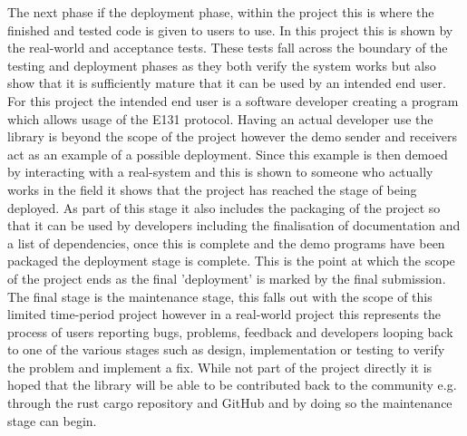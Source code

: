 \documentclass[11pt,a4paper]{report}
\begin{document}
The next phase if the deployment phase, within the project this is where the finished and tested code is given to users to use. In this project this is shown by the real-world and acceptance tests. These tests fall across the boundary of the testing and deployment phases as they both verify the system works but also show that it is sufficiently mature that it can be used by an intended end user. For this project the intended end user is a software developer creating a program which allows usage of the E131 protocol. Having an actual developer use the library is beyond the scope of the project however the demo sender and receivers act as an example of a possible deployment. Since this example is then demoed by interacting with a real-system and this is shown to someone who actually works in the field it shows that the project has reached the stage of being deployed. As part of this stage it also includes the packaging of the project so that it can be used by developers including the finalisation of documentation and a list of dependencies, once this is complete and the demo programs have been packaged the deployment stage is complete. This is the point at which the scope of the project ends as the final 'deployment' is marked by the final submission.\\

The final stage is the maintenance stage, this falls out with the scope of this limited time-period project however in a real-world project this represents the process of users reporting bugs, problems, feedback and developers looping back to one of the various stages such as design, implementation or testing to verify the problem and implement a fix. While not part of the project directly it is hoped that the library will be able to be contributed back to the community e.g. through the rust cargo repository and GitHub and by doing so the maintenance stage can begin. \\
\end{document}
